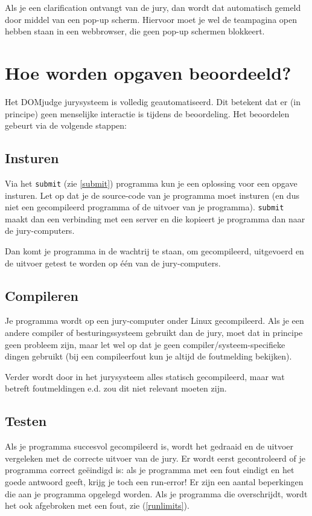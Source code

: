 \documentclass[11pt,a4paper]{article}
\newcommand{\DOMjudge}{\textsc{DOM}judge }
\begin{document}
Als je een clarification ontvangt van de jury, dan wordt dat
automatisch gemeld door middel van een pop-up scherm. Hiervoor moet je
wel de teampagina open hebben staan in een webbrowser, die geen pop-up
schermen blokkeert.

\section{Hoe worden opgaven beoordeeld?}

Het \DOMjudge jurysysteem is volledig geautomatiseerd. Dit betekent
dat er (in principe) geen menselijke interactie is tijdens de
beoordeling. Het beoordelen gebeurt via de volgende stappen:

\subsection{Insturen}

Via het \texttt{submit} (zie \ref{submit}) programma kun je een
oplossing voor een opgave insturen. Let op dat je de source-code van
je programma moet insturen (en dus niet een gecompileerd programma of de
uitvoer van je programma). \texttt{submit} maakt dan een verbinding
met een server en die kopieert je programma dan naar de
jury-computers.

Dan komt je programma in de wachtrij te staan, om gecompileerd,
uitgevoerd en de uitvoer getest te worden op \'e\'en van de
jury-computers.

\subsection{Compileren}

Je programma wordt op een jury-computer onder Linux gecompileerd.
Als je een andere compiler of besturingssysteem gebruikt dan de jury,
moet dat in principe geen probleem zijn, maar let wel op dat
je geen compiler/systeem-specifieke dingen gebruikt (bij een
compileerfout kun je altijd de foutmelding bekijken).

Verder wordt door in het jurysysteem alles statisch gecompileerd, maar
wat betreft foutmeldingen e.d. zou dit niet relevant moeten zijn.

\subsection{Testen}

Als je programma succesvol gecompileerd is, wordt het gedraaid en de
uitvoer vergeleken met de correcte uitvoer van de jury. Er wordt eerst
gecontroleerd of je programma correct ge\"eindigd is: als je programma
met een fout eindigt en het goede antwoord geeft, krijg je toch een
run-error! Er zijn een aantal beperkingen die aan je programma
opgelegd worden. Als je programma die overschrijdt, wordt het ook
afgebroken met een fout, zie (\ref{runlimits}).
\end{document}
